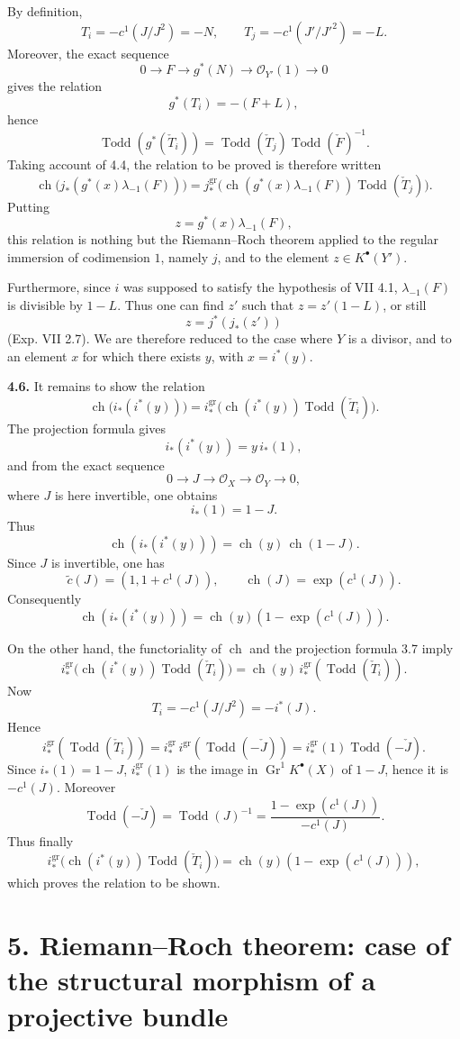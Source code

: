 \documentclass[11pt]{article}
\newcommand{\Gr}{\operatorname{Gr}}
\newcommand{\ch}{\operatorname{ch}}
\newcommand{\Todd}{\operatorname{Todd}}
\providecommand{\ch}{\operatorname{ch}}
\providecommand{\Todd}{\operatorname{Todd}}
\providecommand{\Gr}{\operatorname{Gr}}
\providecommand{\Gr}{\operatorname{G}}
\begin{document}
By definition,
\[
 T_i=-c^1(J/J^2)=-N,\qquad
 T_j=-c^1(J'/J'^2)=-L.
\]
Moreover, the exact sequence
\[
0\longrightarrow F\longrightarrow g^*(N)\longrightarrow \mathcal O_{Y'}(1)\longrightarrow0
\]
gives the relation
\[
 g^*(T_i)=-(F+L),
\]
hence
\[
 \Todd(g^*(\check T_i))=\Todd(\check T_j)\Todd(\check F)^{-1}.
\]
Taking account of 4.4, the relation to be proved is therefore written
\[
 \ch\bigl(j_*(g^*(x)\lambda_{-1}(F))\bigr)
 =
 j^{\mathrm{gr}}_*\bigl(\ch(g^*(x)\lambda_{-1}(F))\Todd(\check T_j)\bigr).
\]
Putting
\[
z=g^*(x)\lambda_{-1}(F),
\]
this relation is nothing but the Riemann--Roch theorem applied to the regular immersion of codimension \(1\), namely \(j\), and to the element \(z\in K^{\bullet}(Y')\).

Furthermore, since \(i\) was supposed to satisfy the hypothesis of VII 4.1, \(\lambda_{-1}(F)\) is divisible by \(1-L\). Thus one can find \(z'\) such that \(z=z'(1-L)\), or still
\[
 z=j^*(j_*(z'))
\]
(Exp. VII 2.7). We are therefore reduced to the case where \(Y\) is a divisor, and to an element \(x\) for which there exists \(y\), with \(x=i^*(y)\).

\textbf{4.6.} It remains to show the relation
\[
 \ch\bigl(i_*(i^*(y))\bigr)
 =
 i^{\mathrm{gr}}_*\bigl(\ch(i^*(y))\Todd(\check T_i)\bigr).
\]
The projection formula gives
\[
 i_*(i^*(y))=y\,i_*(1),
\]
and from the exact sequence
\[
0\longrightarrow J\longrightarrow\mathcal O_X\longrightarrow\mathcal O_Y\longrightarrow0,
\]
where \(J\) is here invertible, one obtains
\[
 i_*(1)=1-J.
\]
Thus
\[
 \ch(i_*(i^*(y)))=\ch(y)\,\ch(1-J).
\]
Since \(J\) is invertible, one has
\[
 \widetilde c(J)=(1,1+c^1(J)),\qquad \ch(J)=\exp(c^1(J)).
\]
Consequently
\[
 \ch(i_*(i^*(y)))=\ch(y)(1-\exp(c^1(J))).
\]

On the other hand, the functoriality of \(\ch\) and the projection formula 3.7 imply
\[
 i^{\mathrm{gr}}_*\bigl(\ch(i^*(y))\Todd(\check T_i)\bigr)
 =
 \ch(y)\,i^{\mathrm{gr}}_*(\Todd(\check T_i)).
\]
Now
\[
T_i=-c^1(J/J^2)=-i^*(J).
\]
Hence
\[
 i^{\mathrm{gr}}_*(\Todd(\check T_i))
 =
 i^{\mathrm{gr}}_*\,i^{\mathrm{gr}}(\Todd(-\check J))
 =
 i^{\mathrm{gr}}_*(1)\Todd(-\check J).
\]
Since \(i_*(1)=1-J\), \(i^{\mathrm{gr}}_*(1)\) is the image in \(\Gr^1K^{\bullet}(X)\) of \(1-J\), hence it is \(-c^1(J)\). Moreover
\[
 \Todd(-\check J)=\Todd(J)^{-1}
 =
 \frac{1-\exp(c^1(J))}{-c^1(J)}.
\]
Thus finally
\[
 i^{\mathrm{gr}}_*\bigl(\ch(i^*(y))\Todd(\check T_i)\bigr)
 =
 \ch(y)(1-\exp(c^1(J))),
\]
which proves the relation to be shown.

\section*{5. Riemann--Roch theorem: case of the structural morphism of a projective bundle}
\end{document}
